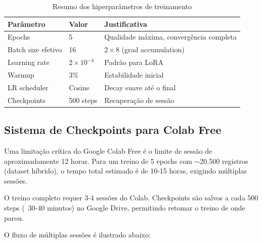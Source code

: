 \begin{table}[H]
\centering
\caption{Resumo dos hiperparâmetros de treinamento}
\label{tab:hiperparametros}
\begin{tabular}{lll}
\toprule
\textbf{Parâmetro} & \textbf{Valor} & \textbf{Justificativa} \\
\midrule
Epochs & 5 & Qualidade máxima, convergência completa \\
Batch size efetivo & 16 & $2 \times 8$ (grad accumulation) \\
Learning rate & $2 \times 10^{-4}$ & Padrão para LoRA \\
Warmup & 3\% & Estabilidade inicial \\
LR scheduler & Cosine & Decay suave até o final \\
Checkpoints & 500 steps & Recuperação de sessão \\
\bottomrule
\end{tabular}
\end{table}

\subsection{Sistema de Checkpoints para Colab Free}
\label{subsec:checkpoints}

Uma limitação crítica do Google Colab Free é o limite de sessão de aproximadamente 12 horas. Para um treino de 5 epochs com $\sim$20.500 registros (dataset híbrido), o tempo total estimado é de 10-15 horas, exigindo múltiplas sessões.

\begin{warningbox}
O treino completo requer 3-4 sessões do Colab. Checkpoints são salvos a cada 500 steps (~30-40 minutos) no Google Drive, permitindo retomar o treino de onde parou.
\end{warningbox}

O fluxo de múltiplas sessões é ilustrado abaixo:

